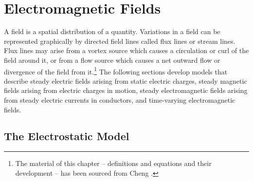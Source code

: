 \setlength{\parindent}{0.5cm}
\chapter{Electromagnetic Fields}\label{sec:electromagnetic_fields}
A field is a spatial distribution of a quantity.  Variations in a field can be represented graphically by directed field lines called flux lines or stream lines.  Flux lines may arise from a vortex source which causes a circulation or curl of the field around it, or from a flow source which causes a net outward flow or divergence of the field from it.\footnote{The material of this chapter -- definitions and equations and their development -- has been sourced from Cheng \cite{Cheng1989}.}  The following sections develop models that describe steady electric fields arising from static electric charges, steady magnetic fields arising from electric charges in motion, steady electromagnetic fields arising from steady electric currents in conductors, and time-varying electromagnetic fields.


\section{The Electrostatic Model}\label{sec:electrostatics}

